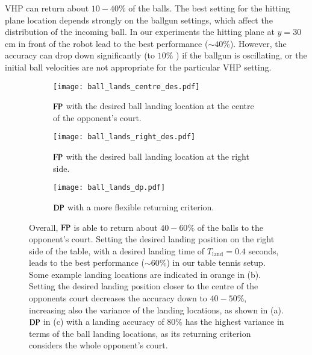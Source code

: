 VHP can return about $10-40\%$ of the balls. The best setting for the hitting plane location depends strongly on the ballgun settings, which affect the distribution of the incoming ball. In our experiments the hitting plane at $y = 30$ cm in front of the robot lead to the best performance ($\sim 40\%$). However, the accuracy can drop down significantly (to $10\%$ ) if the ballgun is oscillating, or the initial ball velocities are not appropriate for the particular VHP setting.
%
%
\begin{figure*}
	\centering
	\begin{minipage}[b]{.3\linewidth}
		\begin{subfigure}[t]{0.9\textwidth}
		\texttt{[image: ball\_lands\_centre\_des.pdf]}
		\caption{$\mathrm{FP}$ with the desired ball landing location at the centre of the opponent's court.}
		\label{ball_land_des_centre}
		\end{subfigure}
	\end{minipage}%
	\begin{minipage}[b]{.3\linewidth}
		\begin{subfigure}[t]{0.9\textwidth}
		\texttt{[image: ball\_lands\_right\_des.pdf]}
		\label{ball_land_des_right}
		\caption{$\mathrm{FP}$ with the desired ball landing location at the right side.}
		\end{subfigure}
	\end{minipage}
	\begin{minipage}[b]{.3\linewidth}
		\begin{subfigure}[t]{0.8\textwidth}
		\texttt{[image: ball\_lands\_dp.pdf]}
		\label{ball_land_dp}
		\caption{$\mathrm{DP}$ with a more flexible returning criterion.}
		\end{subfigure}
	\end{minipage}
	\caption{Overall, $\mathrm{FP}$ is able to return about $40-60 \%$ of the balls to the opponent's court. Setting the desired landing position on the right side of the table, with a desired landing time of $T_{\textrm{land}} = 0.4$ seconds, leads to the best performance ($\sim 60\%$) in our table tennis setup. Some example landing locations are indicated in orange in (b). Setting the desired landing position closer to the centre of the opponents court decreases the accuracy down to $40-50\%$, increasing also the variance of the landing locations, as shown in (a). $\mathrm{DP}$ in (c) with a landing accuracy of $80 \%$ has the highest variance in terms of the ball landing locations, as its returning criterion considers the whole opponent's court.}
	\label{distr_returns}
\end{figure*}
